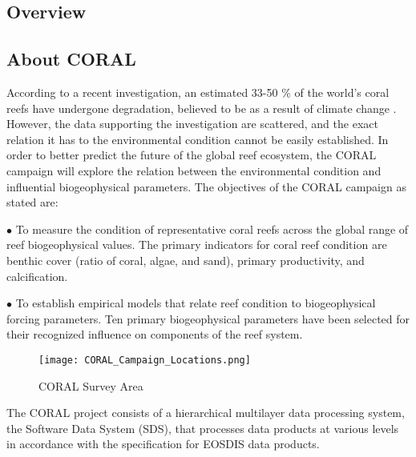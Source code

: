 \documentclass{article}
\begin{document}
\begin{multicols*}{2}
\section{Overview}
\subsection{About CORAL}
	According to a recent investigation, an estimated 33-50 \% of the world's coral reefs have undergone degradation, believed to be as a result of climate change \cite{Reef_Studies}. However, the data supporting the investigation are scattered, and the exact relation it has to the environmental condition cannot be easily established. In order to better predict the future of the global reef ecosystem, the CORAL campaign will explore the relation between the environmental condition and influential biogeophysical parameters. The objectives of the CORAL campaign as stated \cite{bio_parameters} are:

$\bullet$ To measure the condition of representative coral reefs across the global range of reef biogeophysical values. The primary indicators for coral reef condition are benthic cover (ratio of coral, algae, and sand), primary productivity, and calcification.

$\bullet$ To establish empirical models that relate reef condition to biogeophysical forcing parameters. Ten primary biogeophysical parameters have been selected for their recognized influence on components of the reef system. \cite{bio_parameters} 

\begin{figure}[H]
\centering
\texttt{[image: CORAL\_Campaign\_Locations.png]}
\caption{CORAL Survey Area \cite{bio_parameters}}
\end{figure}
The CORAL project consists of a hierarchical multilayer data processing system, the Software Data System (SDS), that processes data products at various levels in accordance with the specification for EOSDIS data products. \cite{EOSIS}


\end{multicols*}
\end{document}
